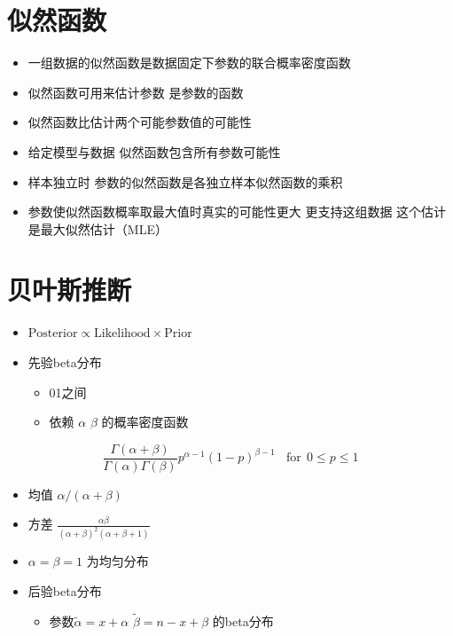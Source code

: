 \documentclass[]{book}
\providecommand{\tightlist}{%
  \setlength{\itemsep}{0pt}\setlength{\parskip}{0pt}}
\begin{document}
\hypertarget{ux4f3cux7136ux51fdux6570}{%
\section{似然函数}\label{ux4f3cux7136ux51fdux6570}}

\begin{itemize}
\tightlist
\item
  一组数据的似然函数是数据固定下参数的联合概率密度函数
\item
  似然函数可用来估计参数 是参数的函数
\item
  似然函数比估计两个可能参数值的可能性
\item
  给定模型与数据 似然函数包含所有参数可能性
\item
  样本独立时 参数的似然函数是各独立样本似然函数的乘积
\item
  参数使似然函数概率取最大值时真实的可能性更大 更支持这组数据 这个估计是最大似然估计（MLE）
\end{itemize}

\hypertarget{ux8d1dux53f6ux65afux63a8ux65ad}{%
\section{贝叶斯推断}\label{ux8d1dux53f6ux65afux63a8ux65ad}}

\begin{itemize}
\tightlist
\item
  \(\mbox{Posterior} \propto \mbox{Likelihood} \times \mbox{Prior}\)
\item
  先验beta分布

  \begin{itemize}
  \tightlist
  \item
    01之间
  \item
    依赖 \(\alpha\) \(\beta\) 的概率密度函数
  \end{itemize}
\end{itemize}

\[
\frac{\Gamma(\alpha +  \beta)}{\Gamma(\alpha)\Gamma(\beta)}
 p ^ {\alpha - 1} (1 - p) ^ {\beta - 1} ~~~~\mbox{for} ~~ 0 \leq p \leq 1
\]

\begin{itemize}
\tightlist
\item
  均值 \(\alpha / (\alpha + \beta)\)
\item
  方差 \(\frac{\alpha \beta}{(\alpha + \beta)^2 (\alpha + \beta + 1)}\)
\item
  \(\alpha = \beta = 1\) 为均匀分布
\item
  后验beta分布

  \begin{itemize}
  \tightlist
  \item
    参数\(\tilde \alpha = x + \alpha\) \(\tilde \beta = n - x + \beta\) 的beta分布
  \end{itemize}
\end{itemize}
\end{document}
